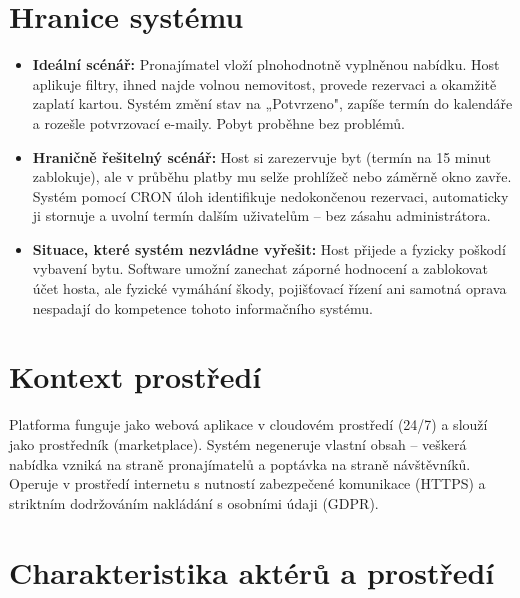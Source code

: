 \documentclass[11pt, a4paper]{article}
\begin{document}
\section{Hranice systému}

\begin{itemize}
  \item \textbf{Ideální scénář:}
    Pronajímatel vloží plnohodnotně vyplněnou nabídku. Host aplikuje filtry, ihned najde volnou nemovitost, provede rezervaci a okamžitě zaplatí kartou. Systém změní stav na „Potvrzeno", zapíše termín do kalendáře a rozešle potvrzovací e-maily. Pobyt proběhne bez problémů.

  \item \textbf{Hraničně řešitelný scénář:}
    Host si zarezervuje byt (termín na 15 minut zablokuje), ale v průběhu platby mu selže prohlížeč nebo záměrně okno zavře. Systém pomocí CRON úloh identifikuje nedokončenou rezervaci, automaticky ji stornuje a uvolní termín dalším uživatelům -- bez zásahu administrátora.

  \item \textbf{Situace, které systém nezvládne vyřešit:}
    Host přijede a fyzicky poškodí vybavení bytu. Software umožní zanechat záporné hodnocení a zablokovat účet hosta, ale fyzické vymáhání škody, pojišťovací řízení ani samotná oprava nespadají do kompetence tohoto informačního systému.
\end{itemize}

\section{Kontext prostředí}

Platforma funguje jako webová aplikace v cloudovém prostředí (24/7) a slouží jako prostředník (marketplace). Systém negeneruje vlastní obsah -- veškerá nabídka vzniká na straně pronajímatelů a poptávka na straně návštěvníků. Operuje v prostředí internetu s nutností zabezpečené komunikace (HTTPS) a striktním dodržováním nakládání s osobními údaji (GDPR).

\section{Charakteristika aktérů a prostředí}
\end{document}

